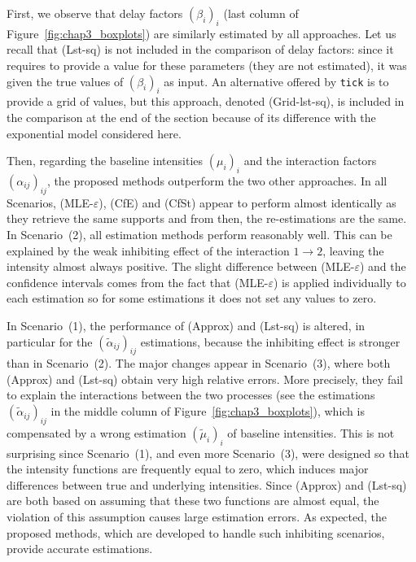     First, we observe that delay factors \((\beta_i)_i\)
    (last column of Figure~\ref{fig:chap3_boxplots})
    are similarly estimated by all approaches.
    Let us recall that (Lst-sq) is not included in the comparison of delay factors:
    since it requires to provide a value for these parameters (they are not estimated),
    it was given the true values of \((\beta_i)_i\) as input.
    An alternative offered by \texttt{tick} is to provide a grid
    of values, but this approach, denoted (Grid-lst-sq), is included in the comparison at the end of the section because of its difference with the exponential model considered here.
    
    Then, regarding the baseline intensities \((\mu_i)_i\) and the interaction factors \((\alpha_{ij})_{ij}\),
    the proposed methods outperform the two other approaches.
    In all Scenarios, (MLE-$\varepsilon$), (CfE) and (CfSt) appear to perform almost identically as they retrieve the same supports and from then, the re-estimations are the same.
    In Scenario~(2), all estimation methods perform reasonably well. 
    This can be explained by the weak inhibiting effect of the interaction $1\to2$, leaving the intensity almost always positive.
    The slight difference between (MLE-$\varepsilon$) and the confidence intervals comes from the fact that (MLE-$\varepsilon$) is applied individually to each estimation so for some estimations it does not set any values to zero.
    
    
    In Scenario~(1), the performance of (Approx) and (Lst-sq) is altered, in particular for the \((\tilde \alpha_{ij})_{ij}\) estimations, because the inhibiting effect is stronger than in Scenario~(2).
    The major changes appear in Scenario~(3), where both (Approx) and (Lst-sq) obtain very high relative errors.
    More precisely, they fail to explain the interactions between the two processes (see the estimations \((\tilde \alpha_{ij})_{ij}\) in the middle column of Figure~\ref{fig:chap3_boxplots}), which is compensated by a wrong estimation \((\tilde \mu_i)_i\) of baseline intensities.
    This is not surprising since Scenario~(1), and even more Scenario~(3), were designed so that the intensity functions are frequently equal to zero, which induces major differences between true and underlying intensities.
    Since (Approx) and (Lst-sq) are both based on assuming that these two functions are almost equal, the violation of this assumption causes large estimation errors.
    As expected, the proposed methods, which are developed to handle such inhibiting scenarios, provide accurate estimations.
    
